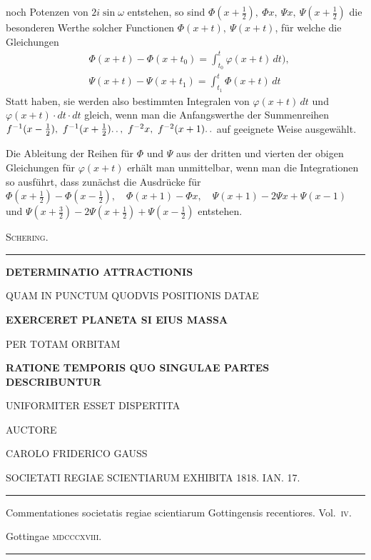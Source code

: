 noch Potenzen von $2i\sin\omega$ entstehen,
so sind $\Phi(x+\tfrac12),\ \Phi x,\ \Psi x,\ \Psi(x+\tfrac12)$ die besonderen Werthe solcher Functionen
$\Phi(x+t),\ \Psi(x+t)$,
für welche die Gleichungen
\[
\begin{aligned}
&\Phi(x+t)-\Phi(x+t_0)=\int_{t_0}^{t}\varphi(x+t)\,dt),\\[6pt]
&\Psi(x+t)-\Psi(x+t_1)=\int_{t_1}^{t}\Phi(x+t)\,dt
\end{aligned}
\]
Statt haben, sie werden also bestimmten Integralen von $\varphi(x+t)\,dt$ und
$\varphi(x+t)\cdot dt\cdot dt$ gleich, wenn
man die Anfangswerthe der Summenreihen
$f^{-1}(x-\tfrac12),\ f^{-1}(x+\tfrac12)\ldotp\ldotp,\ f^{-2}x,\ f^{-2}(x+1)\ldotp\ldotp$
auf geeignete Weise ausgewählt.

Die Ableitung der Reihen für $\Phi$ und $\Psi$ aus der dritten und vierten der obigen Gleichungen für
$\varphi(x+t)$ erhält man unmittelbar, wenn man die Integrationen so ausführt, dass zunächst die Ausdrücke für
$\Phi(x+\tfrac12)-\Phi(x-\tfrac12),\quad \Phi(x+1)-\Phi x,\quad
\Psi(x+1)-2\Psi x+\Psi(x-1)$ und
$\Psi(x+\tfrac32)-2\Psi(x+\tfrac12)+\Psi(x-\tfrac12)$
entstehen.
\begin{flushright}\textsc{Schering.}\end{flushright}
\begin{center}\rule{9em}{0.3pt}\end{center}
\clearpage{}\thispagestyle{empty}
\vspace*{1.5em}
\begin{center}
\textbf{DETERMINATIO ATTRACTIONIS}

QUAM IN PUNCTUM QUODVIS POSITIONIS DATAE

\textbf{EXERCERET PLANETA SI EIUS MASSA}

PER TOTAM ORBITAM

\textbf{RATIONE TEMPORIS QUO SINGULAE PARTES DESCRIBUNTUR}

UNIFORMITER ESSET DISPERTITA

\bigskip
AUCTORE

\bigskip
CAROLO FRIDERICO GAUSS

\bigskip
SOCIETATI REGIAE SCIENTIARUM EXHIBITA 1818. IAN. 17.

\bigskip
\rule{0.7\linewidth}{0.4pt}

Commentationes societatis regiae scientiarum Gottingensis recentiores. Vol.~\textsc{iv}.

Gottingae \textsc{mdcccxviii}.

\rule{0.7\linewidth}{0.4pt}
\end{center}

